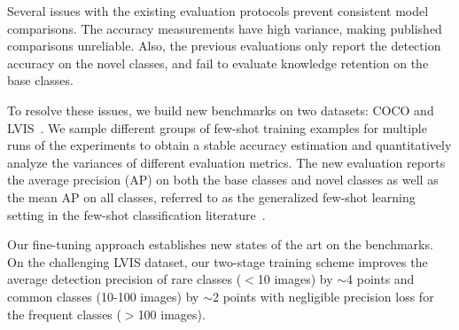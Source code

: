 Several issues with the existing evaluation protocols prevent consistent model comparisons. The accuracy measurements have high variance, making published comparisons unreliable.  Also, the previous evaluations only report the detection accuracy on the novel classes, and fail to evaluate knowledge retention on the base classes.

To resolve these issues, we build new benchmarks on two datasets: COCO and LVIS~\cite{gupta2019lvis}.
We sample different groups of few-shot training examples for multiple runs of the experiments to obtain a stable accuracy estimation and quantitatively analyze the variances of different evaluation metrics. The new evaluation reports the average precision (AP) on both the base classes and novel classes as well as the mean AP on all classes, referred to as the generalized few-shot learning setting in the few-shot classification literature~\cite{hariharan2017low,wang2019tafe}.

Our fine-tuning approach establishes new states of the art on the benchmarks.  
On the challenging LVIS dataset, our two-stage training scheme improves the average detection precision of rare classes
($<$10 images) by $\sim$4 points and common classes (10-100 images) by $\sim$2 points with negligible precision loss for the frequent classes ($>$100 images). 
